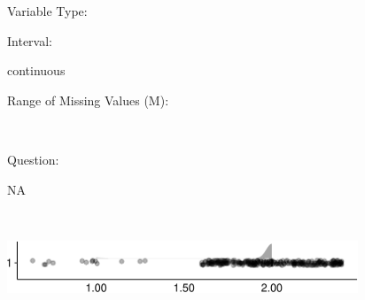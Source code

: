\documentclass[
]{article}
\begin{document}
\begin{minipage}[t]{0.3\linewidth}

Variable Type:

\end{minipage}%
\begin{minipage}[t]{0.7\linewidth}

\end{minipage}

\begin{minipage}[t]{0.3\linewidth}

Interval:

\end{minipage}%
\begin{minipage}[t]{0.7\linewidth}

continuous

\end{minipage}

\begin{minipage}[t]{0.3\linewidth}

Range of Missing Values (M):

\end{minipage}%
\begin{minipage}[t]{0.7\linewidth}

~

\end{minipage}

\begin{minipage}[t]{0.3\linewidth}

Question:

\end{minipage}%
\begin{minipage}[t]{0.7\linewidth}

NA

\end{minipage}

\begin{minipage}[t]{0.3\linewidth}

~

\end{minipage}%
\begin{minipage}[t]{0.7\linewidth}

\includegraphics[width=396px]{codebook_template_files/figure-latex/help_pos_rainplot-1}

\end{minipage}
 \vspace*{-5mm} 
\end{document}
